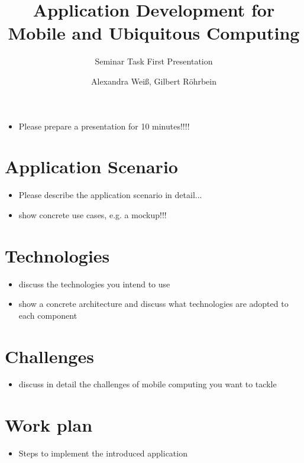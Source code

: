\documentclass[ddc nogerman]{tudbeamer}
\begin{document}

\title{Application Development for Mobile and Ubiquitous Computing}
\subtitle{Seminar Task First Presentation}
\author{Alexandra Weiß, Gilbert Röhrbein}

\maketitle

\begin{frame}
    \begin{itemize}
        \item Please prepare a presentation for 10 minutes!!!!
    \end{itemize}
\end{frame}

\section{Application Scenario}
\begin{frame}
    \begin{itemize}
        \item Please describe the application scenario in detail...
        \item show concrete use cases, e.g. a mockup!!!
    \end{itemize}
\end{frame}

\section{Technologies}
\begin{frame}
    \begin{itemize}
        \item discuss the technologies you intend to use
        \item show a concrete architecture and discuss what technologies are
            adopted to each component
    \end{itemize}
\end{frame}

\section{Challenges}
\begin{frame}
    \begin{itemize}
        \item discuss in detail the challenges of mobile computing you want to
            tackle
    \end{itemize}
\end{frame}

\section{Work plan}
\begin{frame}
    \begin{itemize}
        \item Steps to implement the introduced application
    \end{itemize}
\end{frame}
\end{document}
